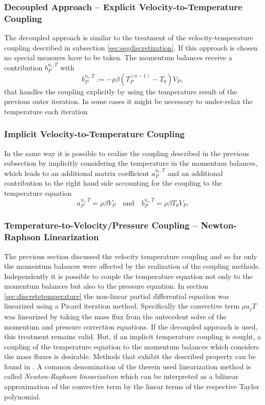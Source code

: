\subsubsection{Decoupled Approach -- Explicit Velocity-to-Temperature Coupling}

The decoupled approach is similar to the treatment of the velocity-temperature coupling described in subsection \ref{sec:segdiscretization}. If this approach is chosen no special measures have to be taken. The momentum balances receive a contribution \( b_P^{u_i,T}\) with
\begin{displaymath}
  b_P^{u_i,T} := - \rho \beta \left( T_P^{(n-1)} - T_0 \right) V_P,
\end{displaymath}
that handles the coupling explicitly by using the temperature result of the previous outer iteration. In some cases it might be necessary to under-relax the temperature each iteration

\subsubsection{Implicit Velocity-to-Temperature Coupling}

In the same way it is possible to realize the coupling described in the previous subsection by implicitly considering the temperature in the momentum balances, which leads to an additional matrix coefficient \(a_P^{u_i,T}\) and an additional contribution to the right hand side accounting for the coupling to the temperature equation
\begin{displaymath}
  a_P^{u_i,T} = \rho \beta V_P 
  \quad \text{and} \quad
  b_P^{u_i,T} = \rho \beta T_0 V_P.
\end{displaymath}

\subsubsection{Temperature-to-Velocity/Pressure Coupling -- Newton-Raphson Linearization}
\label{sec:nrcoupled}

The previous section discussed the velocity temperature coupling and so far only the momentum balances were affected by the realization of the coupling methods. Independently it is possible to couple the temperature equation not only to the momentum balances but also to the pressure equation. In section \ref{sec:discretetemperature} the non-linear partial differential equation was linearized using a Picard iteration method. Specifically the convective term \(\rho u_j T\) was linearized by taking the mass flux from the antecedent solve of the momentum and pressure correction equations. If the decoupled approach is used, this treatment remains valid. But, if an implicit temperature coupling is sought, a coupling of the temperature equation to the momentum balances which considers the mass fluxes is desirable. Methods that exhibit the described property can be found in \cite{galpin86,oliveira01,sheu04,vakilipour12}. A common denomination of the therein used linearization method is called \emph{Newton-Raphson linearization} which can be interpreted as a bilinear approximation of the convective term by the linear terms of the respective Taylor polynomial.

